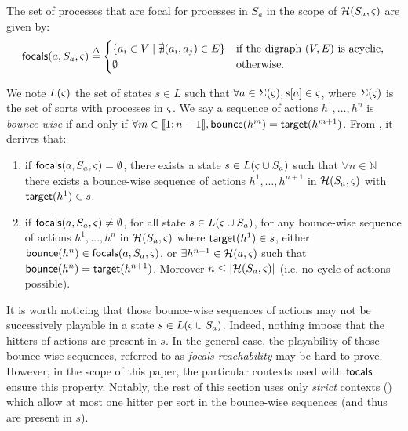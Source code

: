 \begin{definition}\label{def:focals}
The set of processes that are focal for processes in $S_a$ in the scope of $\mathcal{H}(S_a,\varsigma)$
are given by:
\[
\mathsf{focals}(a,S_a,\varsigma) \stackrel{\Delta}=
\begin{cases}
\{ a_i \in V \mid \nexists (a_i,a_j)\in E\} & \text{if the digraph $(V,E)$ is acyclic},\\
\emptyset & \text{otherwise.}\\
\end{cases}
\]
\end{definition}

We note $L(\varsigma)$ the set of states $s\in L$ such that $\forall a\in\Sigma(\varsigma), {s[a]}\in\varsigma$,
where $\Sigma(\varsigma)$ is the set of sorts with processes in $\varsigma$.
We say a sequence of actions $h^1,\dots,h^n$ is \emph{bounce-wise} if and only if
$\forall m\in\llbracket 1 ; n-1 \rrbracket, \mathsf{bounce}(h^m)=\mathsf{target}(h^{m+1})$.
From , it derives that:
\begin{enumerate}
\item if $\mathsf{focals}(a,S_a,\varsigma)=\emptyset$, there exists a 
state $s\in L(\varsigma\cup S_a)$ such that $\forall n\in\mathbb N$ there
exists a bounce-wise sequence of actions $h^1,\dots,h^{n+1}$ in $\mathcal{H}(S_a,\varsigma)$ 
with $\mathsf{target}(h^1)\in s$.
\item if $\mathsf{focals}(a,S_a,\varsigma)\neq\emptyset$, for all
state $s\in L(\varsigma\cup S_a)$,
for any bounce-wise sequence of actions $h^1,\dots,h^n$ in $\mathcal{H}(S_a,\varsigma)$ where $\mathsf{target}(h^1)\in
s$,
either
 $\mathsf{bounce}(h^n) \in \mathsf{focals}(a,S_a,\varsigma)$,
or
$\exists h^{n+1}\in \mathcal{H}(a,\varsigma)$ such that $\mathsf{bounce}(h^n) = \mathsf{target}(h^{n+1})$.
Moreover $n\leq|\mathcal{H}(S_a,\varsigma)|$ (i.e. no cycle of actions possible).
\end{enumerate}

It is worth noticing that those bounce-wise sequences of actions may not be successively playable in
a state $s\in L(\varsigma\cup S_a)$.
Indeed, nothing impose that the hitters of actions are present in $s$.
In the general case, the playability of those bounce-wise sequences, referred to as \emph{focals
reachability} may be hard to prove.
However, in the scope of this paper, the particular contexts used with $\mathsf{focals}$ ensure this property.
Notably, the rest of this section uses only \emph{strict} contexts () which
allow at most one hitter per sort in the bounce-wise sequences (and thus are present in $s$).

